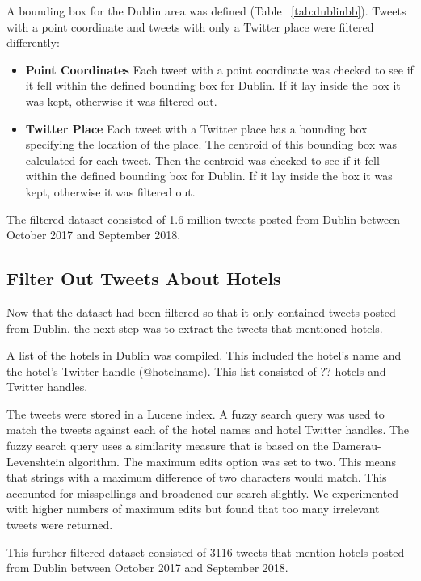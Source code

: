A bounding box for the Dublin area was defined (Table ~\ref{tab:dublinbb}). Tweets with a point coordinate and tweets with only a Twitter place were filtered differently:
\begin{itemize}
    \item \textbf{Point Coordinates}\newline
    Each tweet with a point coordinate was checked to see if it fell within the defined bounding box for Dublin. If it lay inside the box it was kept, otherwise it was filtered out.
    \item \textbf{Twitter Place}\newline
    Each tweet with a Twitter place has a bounding box specifying the location of the place. The centroid of this bounding box was calculated for each tweet. Then the centroid was checked to see if it fell within the defined bounding box for Dublin. If it lay inside the box it was kept, otherwise it was filtered out.
\end{itemize}

The filtered dataset consisted of 1.6 million tweets posted from Dublin between October 2017 and September 2018.

\subsection*{Filter Out Tweets About Hotels}

Now that the dataset had been filtered so that it only contained tweets posted from Dublin, the next step was to extract the tweets that mentioned hotels.

A list of the hotels in Dublin was compiled. This included the hotel's name and the hotel's Twitter handle (@hotelname). This list consisted of ?? hotels and Twitter handles.

The tweets were stored in a Lucene index. A fuzzy search query was used to match the tweets against each of the hotel names and hotel Twitter handles. The fuzzy search query uses a similarity measure that is based on the Damerau-Levenshtein algorithm. The maximum edits option was set to two. This means that strings with a maximum difference of two characters would match. This accounted for misspellings and broadened our search slightly. We experimented with higher numbers of maximum edits but found that too many irrelevant tweets were returned.

This further filtered dataset consisted of 3116 tweets that mention hotels posted from Dublin between October 2017 and September 2018.


